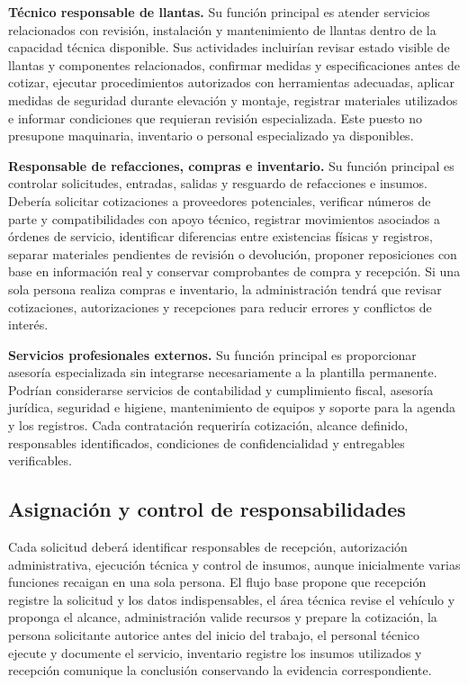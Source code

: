{\textbf{Técnico responsable de llantas.} Su función principal es atender servicios relacionados con revisión, instalación y mantenimiento de llantas dentro de la capacidad técnica disponible. Sus actividades incluirían revisar estado visible de llantas y componentes relacionados, confirmar medidas y especificaciones antes de cotizar, ejecutar procedimientos autorizados con herramientas adecuadas, aplicar medidas de seguridad durante elevación y montaje, registrar materiales utilizados e informar condiciones que requieran revisión especializada. Este puesto no presupone maquinaria, inventario o personal especializado ya disponibles.

\textbf{Responsable de refacciones, compras e inventario.} Su función principal es controlar solicitudes, entradas, salidas y resguardo de refacciones e insumos. Debería solicitar cotizaciones a proveedores potenciales, verificar números de parte y compatibilidades con apoyo técnico, registrar movimientos asociados a órdenes de servicio, identificar diferencias entre existencias físicas y registros, separar materiales pendientes de revisión o devolución, proponer reposiciones con base en información real y conservar comprobantes de compra y recepción. Si una sola persona realiza compras e inventario, la administración tendrá que revisar cotizaciones, autorizaciones y recepciones para reducir errores y conflictos de interés.

\textbf{Servicios profesionales externos.} Su función principal es proporcionar asesoría especializada sin integrarse necesariamente a la plantilla permanente. Podrían considerarse servicios de contabilidad y cumplimiento fiscal, asesoría jurídica, seguridad e higiene, mantenimiento de equipos y soporte para la agenda y los registros. Cada contratación requeriría cotización, alcance definido, responsables identificados, condiciones de confidencialidad y entregables verificables.

\subsection{Asignación y control de responsabilidades}

Cada solicitud deberá identificar responsables de recepción, autorización administrativa, ejecución técnica y control de insumos, aunque inicialmente varias funciones recaigan en una sola persona. El flujo base propone que recepción registre la solicitud y los datos indispensables, el área técnica revise el vehículo y proponga el alcance, administración valide recursos y prepare la cotización, la persona solicitante autorice antes del inicio del trabajo, el personal técnico ejecute y documente el servicio, inventario registre los insumos utilizados y recepción comunique la conclusión conservando la evidencia correspondiente.

}
